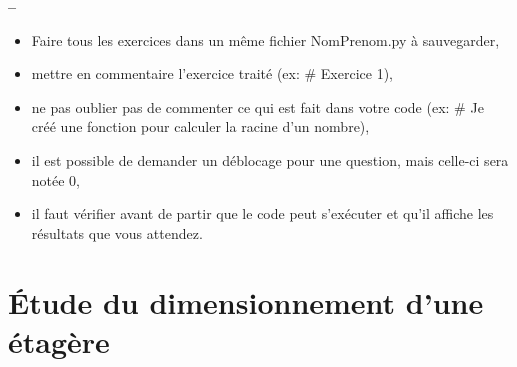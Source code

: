





\begin{center}
{\Large\bf {\type} \no {\numero} -- \descrip}
\end{center}


\begin{boxedminipage}{.9\textwidth} 
\begin{itemize}
 \item Faire tous les exercices dans un même fichier {NomPrenom.py} à sauvegarder,
 \item mettre en commentaire l'exercice traité (ex: \# Exercice 1),
 \item ne pas oublier pas de commenter ce qui est fait dans votre code (ex: \# Je créé une fonction pour calculer la racine d'un nombre),
 \item il est possible de demander un déblocage pour une question, mais celle-ci sera notée 0,
 \item il faut vérifier avant de partir que le code peut s'exécuter et qu'il affiche les résultats que vous attendez.
\end{itemize}
\end{boxedminipage}

\section*{Étude du dimensionnement d'une étagère}

